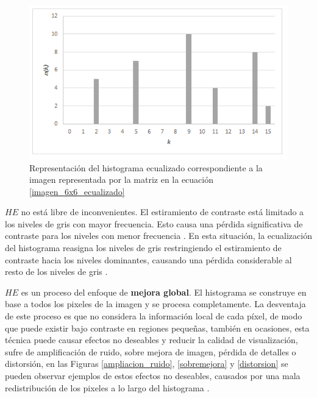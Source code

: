 \begin{enumerate}
        \begin{figure}[H]
        \centering
        \includegraphics[width=14cm]{histograma_matriz_6x6_ecualizado.png}
        \caption{Representación del histograma ecualizado correspondiente a la imagen representada por la matriz en la ecuación \ref{imagen_6x6_ecualizado}}
        \label{histograma_ecualizado_6x6}
    \end{figure}
\end{enumerate}


$HE$ no está libre de inconvenientes. El estiramiento de contraste está limitado a los niveles de gris con mayor frecuencia. Esto causa una pérdida significativa de contraste para los niveles con menor frecuencia \cite{hashemi2009}. En esta situación, la ecualización del histograma reasigna los niveles de gris restringiendo el estiramiento de contraste hacia los niveles dominantes, causando una pérdida considerable al resto de los niveles de gris \cite{Shanmugavadivu2011}.

$HE$ es un proceso del enfoque de \textbf{mejora global}. El histograma se construye en base a todos los pixeles de la imagen y se procesa completamente. La desventaja de este proceso es que no considera la información local de cada píxel, de modo que puede existir bajo contraste en regiones pequeñas, también en ocasiones, esta técnica puede causar efectos no deseables y reducir la calidad de visualización, sufre de amplificación de ruido, sobre mejora de imagen, pérdida de detalles o distorsión, en las Figuras \ref{ampliacion_ruido}, \ref{sobremejora} y \ref{distorsion} se pueden observar ejemplos de estos efectos no deseables, causados por una mala redistribución de los pixeles a lo largo del histograma \cite{chulwoo2013,byong2013,PTS+13}.


